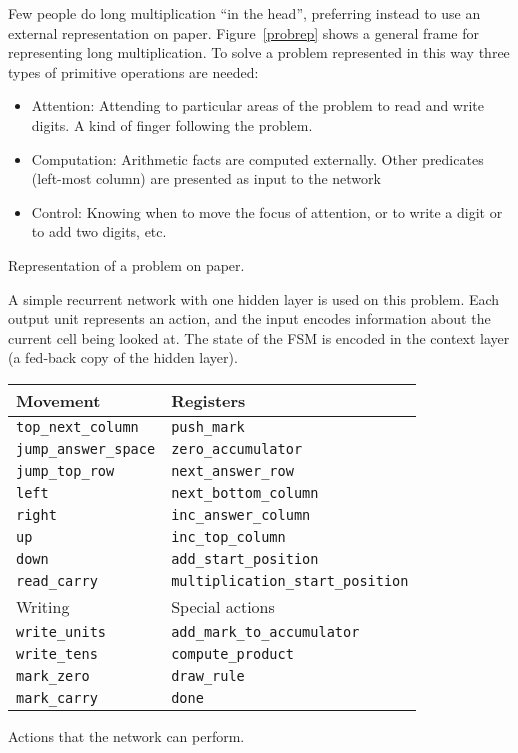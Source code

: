 
Few people do long multiplication ``in the head'', preferring instead to
use an external representation on paper.  Figure~\ref{probrep} shows a
general frame for representing long multiplication.  To solve a problem
represented in this way three types of primitive operations are needed:
\begin{itemize}
\item Attention: Attending to particular areas of the problem to
read and write digits. A kind of finger following the problem.
\item Computation: Arithmetic facts are computed externally.
Other predicates (left-most column) are presented as input to the network
\item Control: Knowing when to move the focus of attention, or to write a
digit or to add two digits, etc.
\end{itemize}

\begin{fancyfigure}
\centerline{}
\caption{Representation of a problem on paper.}
\label{probrep}
\end{fancyfigure}

A simple recurrent network with one hidden layer is used on this problem.
Each output unit represents an action, and the input encodes information
about the current cell being looked at.  The state of the FSM is encoded in
the context layer (a fed-back copy of the hidden layer).

\begin{fancytable}
\begin{center}
\begin{tabular}{ll}
Movement                 &  Registers\\\hline
\verb|top_next_column|   &  \verb|push_mark|\\
\verb|jump_answer_space| &  \verb|zero_accumulator|\\
\verb|jump_top_row|      &  \verb|next_answer_row|\\
\verb|left|              &  \verb|next_bottom_column|\\
\verb|right|             &  \verb|inc_answer_column|\\
\verb|up|                &  \verb|inc_top_column|\\
\verb|down|              &  \verb|add_start_position|\\
\verb|read_carry|        &  \verb|multiplication_start_position|\bigskip\\
Writing                  &  Special actions\\\hline
\verb|write_units|       &  \verb|add_mark_to_accumulator|\\
\verb|write_tens|        &  \verb|compute_product|\\
\verb|mark_zero|         &  \verb|draw_rule|\\
\verb|mark_carry|        &  \verb|done|\\
\end{tabular}
\caption{Actions that the network can perform.}\label{actions}
\end{center}
\end{fancytable}


